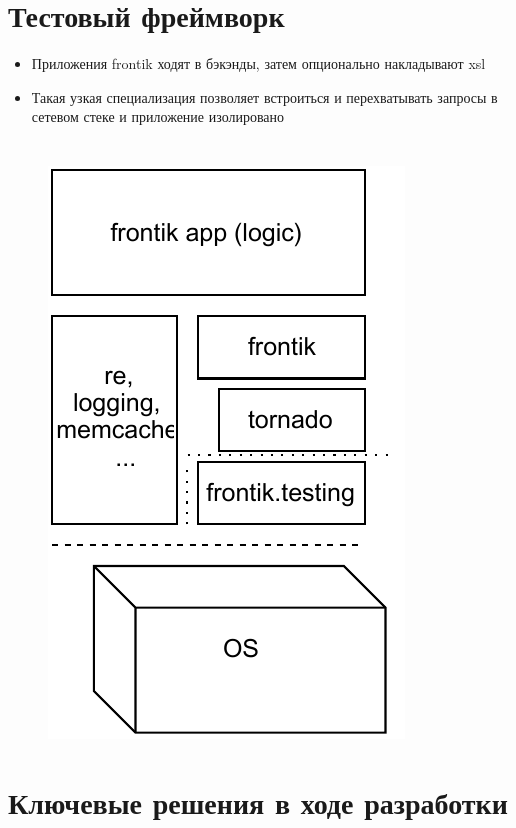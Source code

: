 \documentclass[12pt]{article}
\begin{document}
\section{Тестовый фреймворк}

\begin{itemize}
\item Приложения frontik ходят в бэкэнды, затем опционально накладывают xsl
\item Такая узкая специализация позволяет встроиться и перехватывать запросы в сетевом стеке и приложение изолировано

\end{itemize}

\section{}
\begin{figure}[ht!]
\includegraphics[page=1, scale=1.6]{frontiktesting.pdf}
%
\end{figure}

\section{Ключевые решения в ходе разработки}
\end{document}
